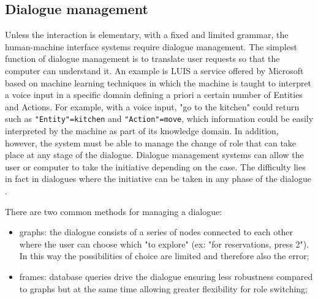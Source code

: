\documentclass{thesisreport}
\begin{document}
 \subsection{Dialogue management}
 Unless the interaction is elementary, with a fixed and limited grammar, the human-machine interface systems require dialogue management.
 The simplest function of dialogue management is to translate user requests so that the computer can understand it. An example is LUIS a service offered by Microsoft based on machine learning techniques in which the machine is taught to interpret a voice input in a specific domain defining a priori a certain number of Entities and Actions. For example, with a voice input, "go to the kitchen" could return such as \texttt{"Entity"=kitchen} and \texttt{"Action"=move}, which information could be easily interpreted by the machine as part of its knowledge domain.
 In addition, however, the system must be able to manage the change of role that can take place at any stage of the dialogue. Dialogue management systems can allow the user or computer to take the initiative depending on the case. The difficulty lies in fact in dialogues where the initiative can be taken in any phase of the dialogue \cite{churcher1997dialogue}.

 There are two common methods for managing a dialogue:
 \begin{itemize}
     \item graphs: the dialogue consists of a series of nodes connected to each other where the user can choose which "to explore" (ex: "for reservations, press 2"). In this way the possibilities of choice are limited and therefore also the error;
     \item frames: database queries drive the dialogue ensuring less robustness compared to graphs but at the same time allowing greater flexibility for role switching;
 \end{itemize}
 
\end{document}
